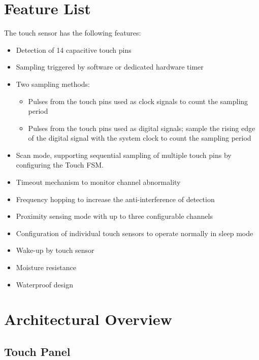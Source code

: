 \documentclass[main\_\_EN.tex]{subfiles}
\begin{document}

\section{Feature List}
\label{sec:tchsen-features}

The \chipname{} touch sensor has the following features:

\begin{itemize}
    \item Detection of 14 capacitive touch pins
    \item Sampling triggered by software or dedicated hardware timer
    \item Two sampling methods:
        \begin{itemize}
            \item Pulses from the touch pins used as clock signals to count the sampling period
            \item Pulses from the touch pins used as digital signals; sample the rising edge of the digital signal with the system clock to count the sampling period
        \end{itemize}
    \item Scan mode, supporting sequential sampling of multiple touch pins by configuring the Touch FSM.
    \item Timeout mechanism to monitor channel abnormality
    \item Frequency hopping to increase the anti-interference of detection
    \item Proximity sensing mode with up to three configurable channels
    \item Configuration of individual touch sensors to operate normally in sleep mode
    \item Wake-up by touch sensor
    \item Moisture resistance
    \item Waterproof design
\end{itemize}



\section{Architectural Overview}
\label{sec:tchsen-arch-overview}

\subsection{Touch Panel}
\end{document}
